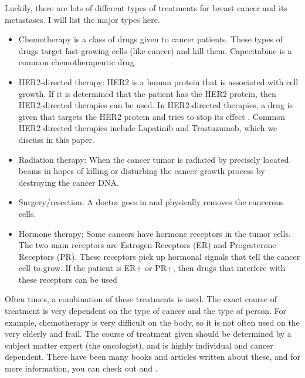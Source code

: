 Luckily, there are lots of different types of treatments for breast cancer and its metastases. I will list the major types here. 
\begin{comment}
(http://www.cancer.gov/types/breast/patient/breast-treatment-pdq)
\end{comment}
\begin{itemize}
\item Chemotherapy is a class of drugs given to cancer patients. These types of drugs target fast growing cells (like cancer) and kill them. Capecitabine is a common chemotherapeutic drug
\item HER2-directed therapy: HER2 is a human protein that is associated with cell growth. If it is determined that the patient has the HER2 protein, then HER2-directed therapies can be used. In HER2-directed therapies, a drug is given that targets the HER2 protein and tries to stop its effect . Common HER2 directed therapies include Lapatinib and Trastuzumab, which we discuss in this paper.
\item Radiation therapy: When the cancer tumor is radiated by precisely located beams in hopes of killing or disturbing the cancer growth process by destroying the cancer DNA.
\item Surgery/resection: A doctor goes in and physically removes the cancerous cells.
\item Hormone therapy: Some cancers have hormone receptors in the tumor cells. The two main receptors are Estrogen Receptors (ER) and Progesterone Receptors (PR). These receptors pick up hormonal signals that tell the cancer cell to grow. If the patient is ER+ or PR+, then drugs that interfere with these receptors can be used
\end{itemize}
Often times, a combination of these treatments is used. The exact course of treatment is very dependent on the type of cancer and the type of person. For example, chemotherapy is very difficult on the body, so it is not often used on the very elderly and frail. The course of treatment given should be determined by a subject matter expert (the oncologist), and is highly individual and cancer dependent.
There have been many books and articles written about these, and for more information, you can check out \cite{Cooper1992} and \cite{Morris1998}.
